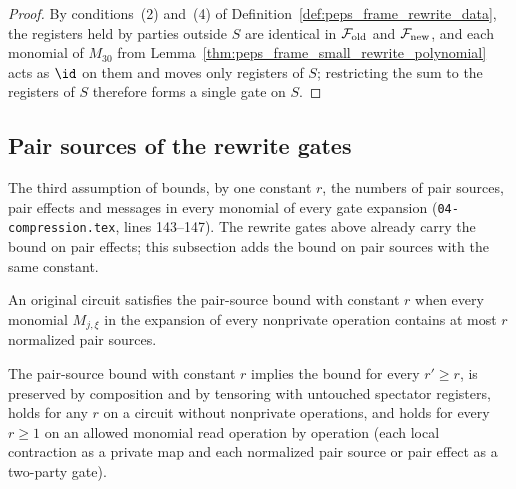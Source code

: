 \begin{proof}\leanok
    By conditions~(2) and~(4) of Definition~\ref{def:peps_frame_rewrite_data}, the registers held by parties outside $S$ are identical in $\mathcal F_{\rm old}$ and $\mathcal F_{\rm new}$, and each monomial of $M_{30}$ from Lemma~\ref{thm:peps_frame_small_rewrite_polynomial} acts as $\id$ on them and moves only registers of $S$; restricting the sum to the registers of $S$ therefore forms a single gate on $S$.
\end{proof}

\subsection{Pair sources of the rewrite gates}

The third assumption of \cite[Theorem~5.2]{OpenAI2026PolynomialPEPS}
bounds, by one constant $r$, the numbers of pair sources, pair effects and
messages in every monomial of every gate expansion
(\texttt{04-compression.tex}, lines 143--147). The rewrite gates above
already carry the bound on pair effects; this subsection adds the bound on
pair sources with the same constant.

\begin{definition}
    \label{def:peps_circuit_source_bound}
    \leanok
    An original circuit satisfies the pair-source bound with constant $r$
    when every monomial $M_{j,\xi}$ in the expansion of every nonprivate
    operation contains at most $r$ normalized pair sources.
\end{definition}

\begin{lemma}
    \label{lem:peps_circuit_source_bound_monomials}
    \leanok
    The pair-source bound with constant $r$ implies the bound for every
    $r'\ge r$, is preserved by composition and by tensoring with untouched spectator registers, holds for any $r$ on a circuit without nonprivate operations, and holds for every $r\ge1$ on an allowed monomial read operation by
    operation (each local contraction as a private map and each normalized pair
    source or pair effect as a two-party gate).
\end{lemma}

